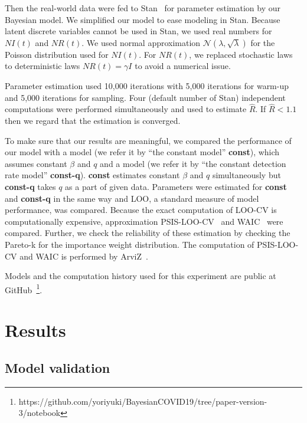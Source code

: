 \documentclass{amsart}
\begin{document}
Then the real-world data were fed to Stan~\cite{carpenter2017stan} for parameter estimation by our Bayesian model.
We simplified our model to ease modeling in Stan.
Because latent discrete variables cannot be used in Stan, we used real numbers for $NI(t)$ and $NR(t)$.
We used normal approximation $\mathcal{N}(\lambda, \sqrt{\lambda})$ for the Poisson distribution used for $NI(t)$.
For $NR(t)$, we replaced stochastic laws to deterministic laws $NR(t) = \gamma I$ to avoid a numerical issue.

Parameter estimation used 10,000 iterations with 5,000 iterations for warm-up and 5,000 iterations for sampling.
Four (default number of Stan) independent computations were performed simultaneously and used to estimate $\hat{R}$.
If $\hat{R} < 1.1$ then we regard that the estimation is converged.

To make sure that our results are meaningful, we compared the performance of our model with a model (we refer it by ``the constant model'' \textbf{const}), which assumes constant $\beta$ and $q$ and a model (we refer it by ``the constant detection rate model'' \textbf{const-q}).
\textbf{const} estimates constant $\beta$ and $q$ simultaneously but \textbf{const-q} takes $q$ as a part of given data.
Parameters were estimated for \textbf{const} and \textbf{const-q} in the same way and LOO, a standard measure of model performance, was compared.
Because the exact computation of LOO-CV is computationally expensive, approximation PSIS-LOO-CV~\cite{Vehtari2017} and WAIC~\cite{watanabe2010asymptotic} were compared.
Further, we check the reliability of these estimation by checking the Pareto-k for the importance weight distribution.
The computation of PSIS-LOO-CV and WAIC is performed by ArviZ~\cite{arviz2019}.

Models and the computation history used for this experiment are public at GitHub~\footnote{https://github.com/yoriyuki/BayesianCOVID19/tree/paper-version-3/notebook}.

\section{Results}

\subsection{Model validation}\label{sec:validation}
\end{document}
